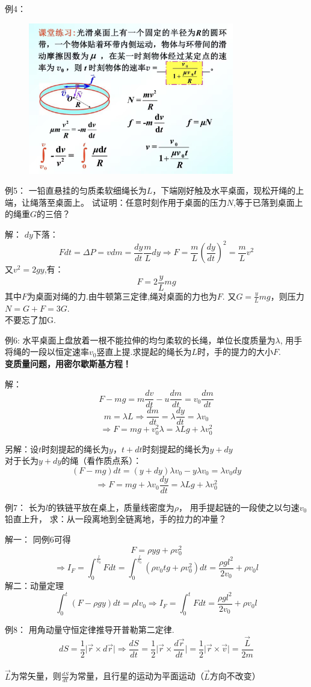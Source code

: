 \documentclass[10pt,a4paper]{article}
\begin{document}
例4：
\begin{figure}[h]
    \centering
    \includegraphics[width=0.8\textwidth]{eg4.jpg}
    \end{figure}
\newpage
例5：
一铅直悬挂的匀质柔软细绳长为$L$，下端刚好触及水平桌面，现松开绳的上端，让绳落至桌面上。
试证明：任意时刻作用于桌面的压力$N$,等于已落到桌面上的绳重$G$的三倍？

\noindent 解：
$dy$下落：
\[Fdt=\Delta P=vdm=\frac{dy}{dt}\frac{m}{L}dy
\Rightarrow
F=\frac{m}{L}(\frac{dy}{dt})^2=\frac{m}{L}v^2
\]
又$v^2=2gy$,有：
\[F=2\frac{y}{L}mg\]
其中$F$为桌面对绳的力.由牛顿第三定律,绳对桌面的力也为$F$.
又$G=\frac{y}{L}mg$，则压力$N=G+F=3G$.\\
不要忘了加G.

例6:
水平桌面上盘放着一根不能拉伸的均匀柔软的长绳，单位长度质量为$\lambda$,
用手将绳的一段以恒定速率$v_0$竖直上提.求提起的绳长为$L$时，手的提力的大小$F$.
\\\textbf{变质量问题，用密尔歇斯基方程！}

\noindent 解：
\[
F-mg=m\frac{dv}{dt}-u\frac{dm}{dt}=v_0\frac{dm}{dt}\]
\[m=\lambda L\Rightarrow \frac{dm}{dt}=\lambda \frac{dy}{dt}=\lambda v_0\]
\[\Rightarrow F=mg+v_0^2 \lambda=\lambda Lg+\lambda v_0^2\]

\noindent 另解：设$t$时刻提起的绳长为$y$，$t+dt$时刻提起的绳长为$y+dy$\\
对于长为$y+dy$的绳（看作质点系）：
\[(F-mg)dt=(y+dy)\lambda v_0-y\lambda v_0=\lambda v_0dy\]
\[\Rightarrow F=mg+\lambda v_0\frac{dy}{dt}=\lambda Lg+\lambda v_0^2\]

例7：
长为$l$的铁链平放在桌上，质量线密度为$\rho$，
用手提起链的一段使之以匀速$v_0$铅直上升，
求：从一段离地到全链离地，手的拉力的冲量？

\noindent 解一：
同例6可得\[F=\rho yg+\rho v_0^2\]
\[\Rightarrow I_F=\int_0^{\frac{l}{v_0}}Fdt
=\int_0^{\frac{l}{v_0}}(\rho v_0tg+\rho v_0^2)dt
=\frac{\rho gl^2}{2v_0}+\rho v_0l\]
\noindent 解二：动量定理
\[\int_0^t(F-\rho gy)dt=\rho lv_0
\Rightarrow I_F=\int_0^tFdt=\frac{\rho gl^2}{2v_0}+\rho v_0l\]

例8：
用角动量守恒定律推导开普勒第二定律.
\[dS=\frac{1}{2}\lvert \vec{r}\times d\vec{r}\rvert
\Rightarrow \frac{dS}{dt}=\frac{1}{2}\lvert \vec{r}\times \frac{d\vec{r}}{dt}\rvert
=\frac{1}{2}\lvert \vec{r}\times \vec{v}\rvert
=\frac{\vec{L}}{2m}
\]\\
$\vec{L}$为常矢量，则$\frac{dS}{dt}$为常量，且行星的运动为平面运动（$\vec{L}$方向不改变）
\end{document}
